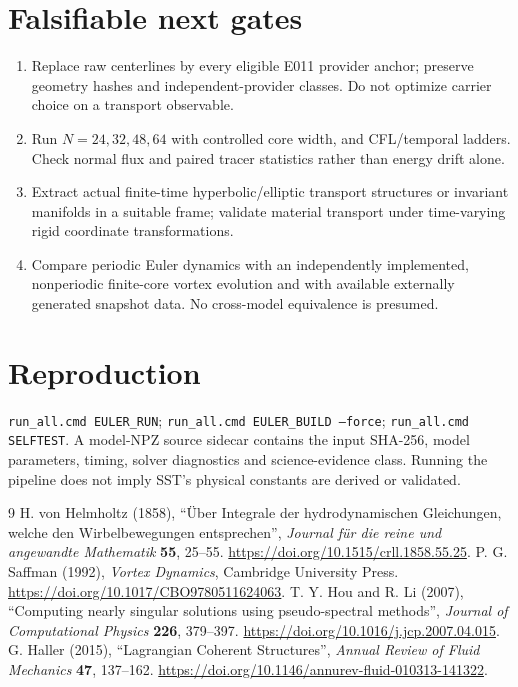 \documentclass[10pt,a4paper]{article}
\begin{document}
\section{Falsifiable next gates}
\begin{enumerate}
\item Replace raw centerlines by every eligible E011 provider anchor; preserve geometry hashes and independent-provider classes. Do not optimize carrier choice on a transport observable.
\item Run $N=24,32,48,64$ with controlled core width, and CFL/temporal ladders. Check normal flux and paired tracer statistics rather than energy drift alone.
\item Extract actual finite-time hyperbolic/elliptic transport structures or invariant manifolds in a suitable frame; validate material transport under time-varying rigid coordinate transformations.
\item Compare periodic Euler dynamics with an independently implemented, nonperiodic finite-core vortex evolution and with available externally generated snapshot data. No cross-model equivalence is presumed.
\end{enumerate}
\section{Reproduction}\texttt{run\_all.cmd EULER\_RUN}; \texttt{run\_all.cmd EULER\_BUILD --force}; \texttt{run\_all.cmd SELFTEST}. A model-NPZ source sidecar contains the input SHA-256, model parameters, timing, solver diagnostics and science-evidence class. Running the pipeline does not imply SST's physical constants are derived or validated.
\begin{thebibliography}{9}
 H. von Helmholtz (1858), ``\"Uber Integrale der hydrodynamischen Gleichungen, welche den Wirbelbewegungen entsprechen'', \emph{Journal f\"ur die reine und angewandte Mathematik} \textbf{55}, 25--55. \url{https://doi.org/10.1515/crll.1858.55.25}.
 P. G. Saffman (1992), \emph{Vortex Dynamics}, Cambridge University Press. \url{https://doi.org/10.1017/CBO9780511624063}.
 T. Y. Hou and R. Li (2007), ``Computing nearly singular solutions using pseudo-spectral methods'', \emph{Journal of Computational Physics} \textbf{226}, 379--397. \url{https://doi.org/10.1016/j.jcp.2007.04.015}.
 G. Haller (2015), ``Lagrangian Coherent Structures'', \emph{Annual Review of Fluid Mechanics} \textbf{47}, 137--162. \url{https://doi.org/10.1146/annurev-fluid-010313-141322}.
\end{thebibliography}
\end{document}
